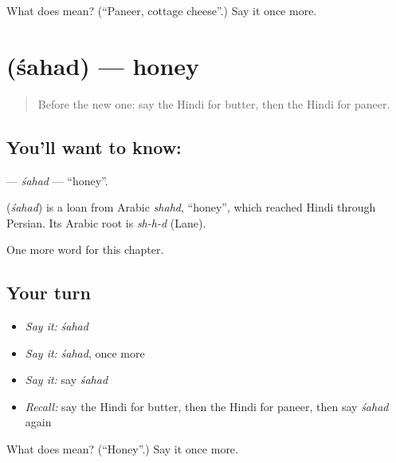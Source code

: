 \begin{tcolorbox}[breakable,colback=teal!4,colframe=teal!35!black,title={Before you move on}]
What does  mean? (\textquotedblleft{}Paneer, cottage cheese\textquotedblright{}.) Say it once more.
\end{tcolorbox}
\section[\texorpdfstring{\hi{शहद} (śahad)}{शहद (śahad)}]{ (śahad) — honey}

\label{lesson:HI-C141-sahad}



\begin{quote}
Before the new one: say the Hindi for butter, then the Hindi for paneer.
\end{quote}

\subsection*{You'll want to know: }
\textbf{} — \emph{śahad} — \textquotedblleft{}honey\textquotedblright{}.

\begin{cousinweb}
\textbf{} (\emph{śahad}) is a loan from Arabic \emph{shahd}, \textquotedblleft{}honey\textquotedblright{}, which reached Hindi through Persian. Its Arabic root is \emph{sh-h-d} (Lane).
\end{cousinweb}

\begin{grammarlens}[title={What you've built}]
One more word for this chapter.
\end{grammarlens}

\subsection*{Your turn}
\begin{itemize}
\raggedright
  \item \emph{Say it:} \emph{śahad}
  \item \emph{Say it:} \emph{śahad}, once more
  \item \emph{Say it:} say \emph{śahad}
  \item \emph{Recall:} say the Hindi for butter, then the Hindi for paneer, then say \emph{śahad} again
\end{itemize}

\begin{tcolorbox}[breakable,colback=teal!4,colframe=teal!35!black,title={Before you move on}]
What does  mean? (\textquotedblleft{}Honey\textquotedblright{}.) Say it once more.
\end{tcolorbox}
